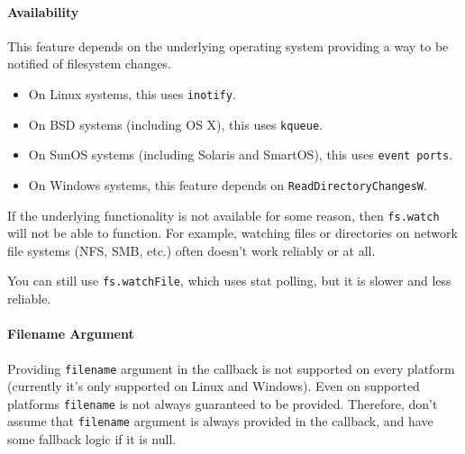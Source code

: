 \paragraph{Availability}

This feature depends on the underlying operating system providing a way
to be notified of filesystem changes.

\begin{itemize}
\item
  On Linux systems, this uses \texttt{inotify}.
\item
  On BSD systems (including OS X), this uses \texttt{kqueue}.
\item
  On SunOS systems (including Solaris and SmartOS), this uses
  \texttt{event ports}.
\item
  On Windows systems, this feature depends on
  \texttt{ReadDirectoryChangesW}.
\end{itemize}

If the underlying functionality is not available for some reason, then
\texttt{fs.watch} will not be able to function. For example, watching
files or directories on network file systems (NFS, SMB, etc.) often
doesn't work reliably or at all.

You can still use \texttt{fs.watchFile}, which uses stat polling, but it
is slower and less reliable.

\paragraph{Filename Argument}

Providing \texttt{filename} argument in the callback is not supported on
every platform (currently it's only supported on Linux and Windows).
Even on supported platforms \texttt{filename} is not always guaranteed
to be provided. Therefore, don't assume that \texttt{filename} argument
is always provided in the callback, and have some fallback logic if it
is null.

\begin{Shaded}
\begin{Highlighting}[]
\NormalTok{(}\NormalTok{, } 
  \NormalTok{(} 
   
    \NormalTok{(} 
  \NormalTok{\} } \NormalTok{\{}
    \NormalTok{(}\NormalTok{);}
  \NormalTok{\}}
\NormalTok{\});}
\end{Highlighting}
\end{Shaded}

